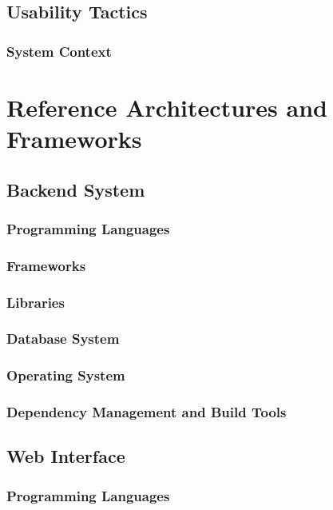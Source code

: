 \documentclass[11pt,fleqn]{book} %
\begin{document}
	\section{Usability Tactics}
	\subsection{System Context}
	
	
	
	\chapter{Reference Architectures and Frameworks}
	
	\section{Backend System}
	\subsection{Programming Languages}
	\subsection{Frameworks}
	\subsection{Libraries}
	\subsection{Database System}
	\subsection{Operating System}
	\subsection{Dependency Management and Build Tools}
	\section{Web Interface}
	\subsection{Programming Languages}
\end{document}
